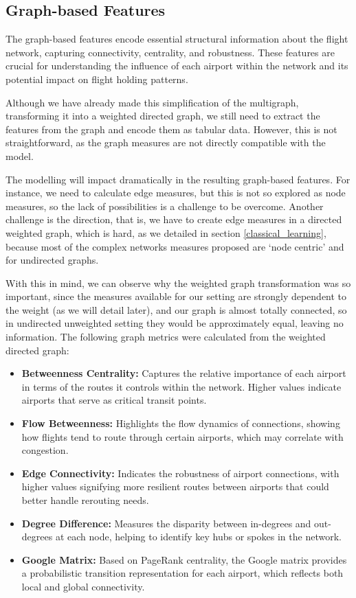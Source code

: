 




\subsection{Graph-based Features}
The graph-based features encode essential structural information about the flight network, capturing connectivity, centrality, and robustness. These features are crucial for understanding the influence of each airport within the network and its potential impact on flight holding patterns. 

Although we have already made this simplification of the multigraph, transforming it into a weighted directed graph, we still need to extract the features from the graph and encode them as tabular data. However, this is not straightforward, as the graph measures are not directly compatible with the model.  

The modelling will impact dramatically in the resulting graph-based features. For instance, we need to calculate edge measures, but this is not so explored as node measures, so the lack of possibilities is a challenge to be overcome.  Another challenge is the direction, that is, we have to create edge measures in a directed weighted graph, which is hard, as we detailed in section \ref{classical_learning}, because most of the complex networks measures proposed are `node centric' and for undirected graphs.

With this in mind, we can observe why the weighted graph transformation was so important, since the measures available for our setting are strongly dependent to the weight (as we will detail later), and our graph is almost totally connected, so in undirected unweighted setting they would be approximately equal, leaving no information. The following graph metrics were calculated from the weighted directed graph:

\begin{itemize}
    \item \textbf{Betweenness Centrality:} Captures the relative importance of each airport in terms of the routes it controls within the network. Higher values indicate airports that serve as critical transit points.
    \item \textbf{Flow Betweenness:} Highlights the flow dynamics of connections, showing how flights tend to route through certain airports, which may correlate with congestion.
    \item \textbf{Edge Connectivity:} Indicates the robustness of airport connections, with higher values signifying more resilient routes between airports that could better handle rerouting needs.
    \item \textbf{Degree Difference:} Measures the disparity between in-degrees and out-degrees at each node, helping to identify key hubs or spokes in the network.
    \item \textbf{Google Matrix:} Based on PageRank centrality, the Google matrix provides a probabilistic transition representation for each airport, which reflects both local and global connectivity.
\end{itemize}

